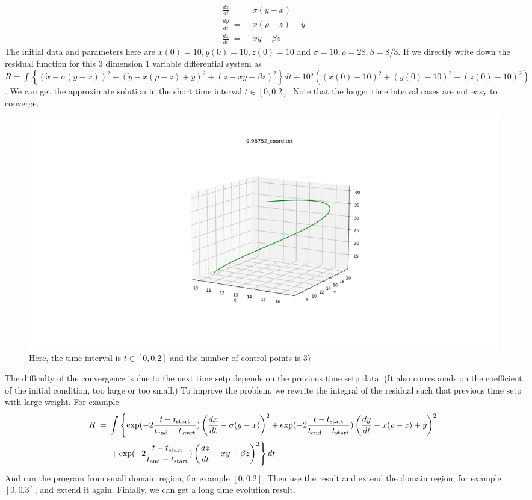 \documentclass[12pt]{article}
\begin{document}
\begin{align*}
	\frac{dx}{dt} \;=\; & \sigma(y-x) \\
	\frac{dy}{dt} \;=\; & x(\rho-z) - y \\
	\frac{dz}{dt} \;=\; & xy-\beta z
\end{align*}
%
The initial data and parameters here are $x(0)=10,y(0)=10,z(0)=10$ and $\sigma=10,\rho=28,\beta=8/3$.
If we directly write down the residual function for this 3 dimension 1 variable differential system as $R = \int \left\{ (\dot{x}-\sigma(y-x))^2 + (\dot{y}-x(\rho-z)+y)^2 + (\dot{z}-xy+\beta z)^2 \right\} dt + 10^5((x(0)-10)^2+(y(0)-10)^2+(z(0)-10)^2)$.
We can get the approximate solution in the short time interval $t\in [0,0.2]$.
Note that the longer time interval cases are not easy to converge.

\begin{figure}[H]
	\centering
	\includegraphics[width=1.0\linewidth]{../lorenz_system/data/lorenz_system_ex.png}
	\caption{Here, the time interval is $t\in [0,0.2]$ and the number of control points is 37}
\end{figure}

The difficulty of the convergence is due to the next time setp depends on the previous time setp data.
(It also corresponds on the coefficient of the initial condition, too large or too small.)
To improve the problem, we rewrite the integral of the residual such that previous time setp with large weight.
For example
%
\begin{align*}
	R \;=\; & \int \left\{ \exp(-2\frac{t-t_{\rm start}}{t_{\rm end}-t_{\rm start}}) \left( \frac{dx}{dt} - \sigma(y-x) \right)^2 + \exp(-2\frac{t-t_{\rm start}}{t_{\rm end}-t_{\rm start}}) \left( \frac{dy}{dt} - x(\rho-z) + y \right)^2 \right.\\
	& \left. + \exp(-2\frac{t-t_{\rm start}}{t_{\rm end}-t_{\rm start}}) \left( \frac{dz}{dt} - xy + \beta z \right)^2 \right\} dt
\end{align*}
%
And run the program from small domain region, for example $[0,0.2]$.
Then use the result and extend the domain region, for example $[0,0.3]$, and extend it again.
Finially, we can get a long time evolution result.
\end{document}
